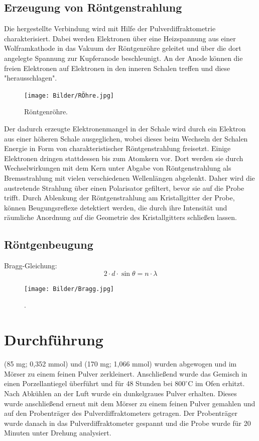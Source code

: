 \documentclass[a4paper,12pt,bibliography=totocnumbered]{scrartcl}
\begin{document}
\subsection{Erzeugung von Röntgenstrahlung}
Die hergestellte Verbindung wird mit Hilfe der Pulverdiffraktometrie charakterisiert.
Dabei werden Elektronen über eine Heizspannung aus einer Wolframkathode in das Vakuum der Röntgenröhre geleitet und über die dort angelegte Spannung zur Kupferanode beschleunigt. 
An der Anode können die freien Elektronen auf Elektronen in den inneren Schalen treffen und diese "herausschlagen".
\begin{figure}[H]
    \centering
    \texttt{[image: Bilder/RÖhre.jpg]}
    \caption{Röntgenröhre. \cite{Kristallgitter}}
    \label{fig: Röhre}
\end{figure}
Der dadurch erzeugte Elektronenmangel in der Schale wird durch ein Elektron aus einer höheren Schale ausgeglichen, wobei dieses beim Wechseln der Schalen Energie in Form von charakteristischer Röntgenstrahlung freisetzt. 
Einige Elektronen dringen stattdessen bis zum Atomkern vor. 
Dort werden sie durch Wechselwirkungen mit dem Kern unter Abgabe von Röntgenstrahlung als Bremsstrahlung mit vielen verschiedenen Wellenlängen abgelenkt.
Daher wird die austretende Strahlung über einen Polarisator gefiltert, bevor sie auf die Probe trifft. 
Durch Ablenkung der Röntgenstrahlung am Kristallgitter der Probe, können Beugungsreflexe detektiert werden, die durch ihre Intensität und räumliche Anordnung auf die Geometrie des Kristallgitters schließen lassen.

\subsection{Röntgenbeugung}

Bragg-Gleichung:
\begin{equation}
    2 \cdot d \cdot \sin \theta = n \cdot \lambda
    \label{Bragg}
\end{equation}

\begin{figure}[H]
    \centering
    \texttt{[image: Bilder/Bragg.jpg]}
    \caption{. \cite{Kristallgitter}}
    \label{fig: Bragg}
\end{figure}

\newpage

\section{Durchführung}
(85 mg; 0,352 mmol) und (170 mg; 1,066 mmol) wurden abgewogen und im Mörser zu einem feinen Pulver zerkleinert. 
Anschließend wurde das Gemisch in einen Porzellantiegel überführt und für 48 Stunden bei $800 ^\circ$C im Ofen erhitzt.\\
Nach Abkühlen an der Luft wurde ein dunkelgraues Pulver erhalten. 
Dieses wurde anschließend erneut mit dem Mörser zu einem feinen Pulver gemahlen und auf den Probenträger des Pulverdiffraktometers getragen. 
Der Probenträger wurde danach in das Pulverdiffraktometer gespannt und die Probe wurde für 20 Minuten unter Drehung analysiert.
\end{document}
